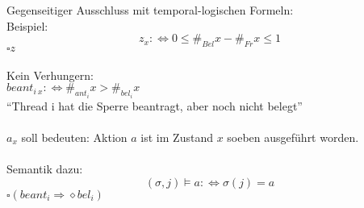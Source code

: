Gegenseitiger Ausschluss mit temporal-logischen Formeln:\\
Beispiel:\\
\begin{equation*}
z_x :\Leftrightarrow 0 \leq \#_{Bel}x - \#_{Fr} x \leq 1
\end{equation*}
$ \square z $\\
\\
Kein Verhungern:\\
$ beant_{i\ x} :\Leftrightarrow \#_{ant_i}x > \#_{bel_i}x $\\
"`Thread i hat die Sperre beantragt, aber noch nicht belegt"'\\
\\
$ a_x $ soll bedeuten: Aktion $ a $ ist im Zustand $ x $ soeben ausgeführt worden.\\
\\ %
Semantik dazu:\\
\begin{equation*}
(\sigma, j) \models a : \Leftrightarrow \sigma(j) = a
\end{equation*}
$ \square (beant_i \Rightarrow \diamond bel_i) $